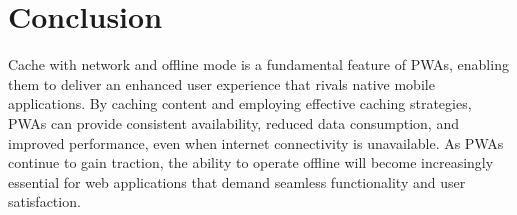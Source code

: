 \documentclass{report}
\begin{document}
\section{Conclusion}\label{Conclusion}
Cache with network and offline mode is a fundamental feature of PWAs, enabling them to deliver an enhanced user experience that rivals native mobile applications. By caching content and employing effective caching strategies, PWAs can provide consistent availability, reduced data consumption, and improved performance, even when internet connectivity is unavailable. As PWAs continue to gain traction, the ability to operate offline will become increasingly essential for web applications that demand seamless functionality and user satisfaction.



%

\end{document}
